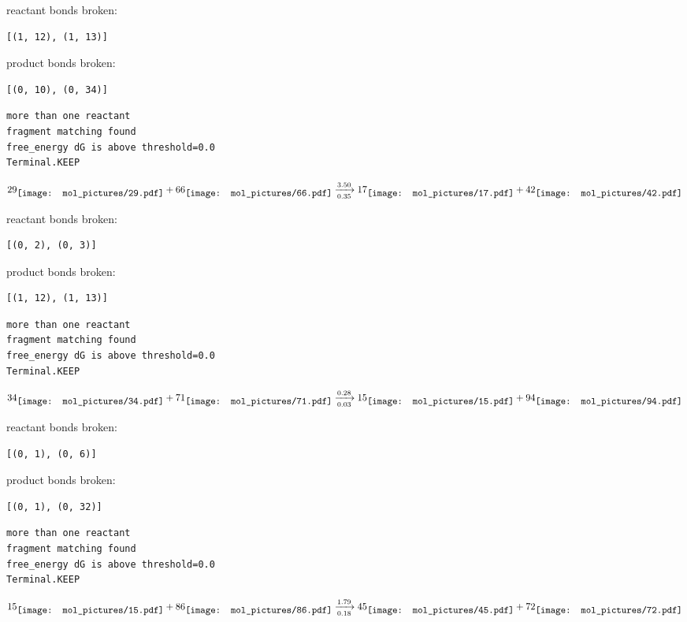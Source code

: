 \documentclass{article}
\begin{document}
reactant bonds broken:\begin{verbatim}
[(1, 12), (1, 13)]
\end{verbatim}
product bonds broken:\begin{verbatim}
[(0, 10), (0, 34)]
\end{verbatim}




\vspace{1cm}
\begin{verbatim}
more than one reactant
fragment matching found
free_energy dG is above threshold=0.0
Terminal.KEEP
\end{verbatim}
$$
29
\raisebox{-.5\height}{\texttt{[image: mol\_pictures/29.pdf]}}
+
66
\raisebox{-.5\height}{\texttt{[image: mol\_pictures/66.pdf]}}
\xrightarrow[0.35]{3.50}
17
\raisebox{-.5\height}{\texttt{[image: mol\_pictures/17.pdf]}}
+
42
\raisebox{-.5\height}{\texttt{[image: mol\_pictures/42.pdf]}}
$$


reactant bonds broken:\begin{verbatim}
[(0, 2), (0, 3)]
\end{verbatim}
product bonds broken:\begin{verbatim}
[(1, 12), (1, 13)]
\end{verbatim}




\vspace{1cm}
\begin{verbatim}
more than one reactant
fragment matching found
free_energy dG is above threshold=0.0
Terminal.KEEP
\end{verbatim}
$$
34
\raisebox{-.5\height}{\texttt{[image: mol\_pictures/34.pdf]}}
+
71
\raisebox{-.5\height}{\texttt{[image: mol\_pictures/71.pdf]}}
\xrightarrow[0.03]{0.28}
15
\raisebox{-.5\height}{\texttt{[image: mol\_pictures/15.pdf]}}
+
94
\raisebox{-.5\height}{\texttt{[image: mol\_pictures/94.pdf]}}
$$


reactant bonds broken:\begin{verbatim}
[(0, 1), (0, 6)]
\end{verbatim}
product bonds broken:\begin{verbatim}
[(0, 1), (0, 32)]
\end{verbatim}




\vspace{1cm}
\begin{verbatim}
more than one reactant
fragment matching found
free_energy dG is above threshold=0.0
Terminal.KEEP
\end{verbatim}
$$
15
\raisebox{-.5\height}{\texttt{[image: mol\_pictures/15.pdf]}}
+
86
\raisebox{-.5\height}{\texttt{[image: mol\_pictures/86.pdf]}}
\xrightarrow[0.18]{1.79}
45
\raisebox{-.5\height}{\texttt{[image: mol\_pictures/45.pdf]}}
+
72
\raisebox{-.5\height}{\texttt{[image: mol\_pictures/72.pdf]}}
$$
\end{document}
